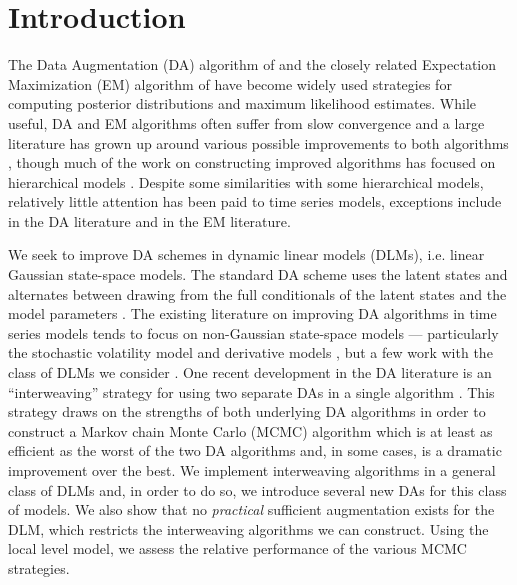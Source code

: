 \documentclass[12pt]{article}
\begin{document}

\section{Introduction}

The Data Augmentation (DA) algorithm of \citet{tanner1987calculation} and the closely related Expectation Maximization (EM) algorithm of \citet{dempster1977maximum} have become widely used strategies for computing posterior distributions and maximum likelihood estimates. While useful, DA and EM algorithms often suffer from slow convergence and a large literature has grown up around various possible improvements to both algorithms \citep{meng1997algorithm,meng1999seeking,liu1999parameter,hobert2008theoretical,yu2011center}, though much of the work on constructing improved algorithms has focused on hierarchical models \citep{gelfand1995efficient,roberts1997updating,meng1998fast,van2001art,bernardo2003non,papaspiliopoulos2007general,papaspiliopoulos2008stability}. Despite some similarities with some hierarchical models, relatively little attention has been paid to time series models, exceptions include \citet{pitt1999analytic,fruhwirth2003bayesian,fruhwirth2006auxiliary} in the DA literature and \citet{van2003one} in the EM literature. 

We seek to improve DA schemes in dynamic linear models (DLMs), i.e. linear Gaussian state-space models. The standard DA scheme uses the latent states and alternates between drawing from the full conditionals of the latent states and the model parameters \citep{fruhwirth1994data,carter1994gibbs}. The existing literature on improving DA algorithms in time series models tends to focus on non-Gaussian state-space models --- particularly the stochastic volatility model and derivative models \citep{shephard1996statistical,fruhwirth2003bayesian,roberts2004bayesian,bos2006inference,strickland2008parameterisation,fruhwirth2008heston,kastner2013ancillarity}, but a few work with the class of DLMs we consider \citep{fruhwirth2004efficient}. One recent development in the DA literature is an ``interweaving'' strategy for using two separate DAs in a single algorithm \citep{yu2011center}. This strategy draws on the strengths of both underlying DA algorithms in order to construct a Markov chain Monte Carlo (MCMC) algorithm which is at least as efficient as the worst of the two DA algorithms and, in some cases, is a dramatic improvement over the best. We implement interweaving algorithms in a general class of DLMs and, in order to do so, we introduce several new DAs for this class of models. We also show that no {\it practical} sufficient augmentation exists for the DLM, which restricts the interweaving algorithms we can construct. Using the local level model, we assess the relative performance of the various MCMC strategies.
\end{document}
